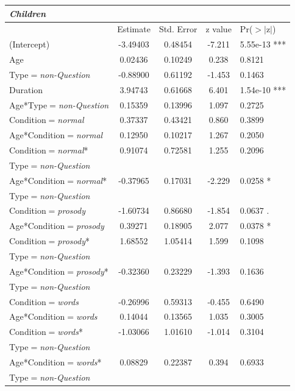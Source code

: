 \documentclass[authoryear, 12pt]{elsarticle}
\begin{document}
\begin{footnotesize}
\begin{longtable}{lcccl}
  \textbf{\textit{Children}} &&&& \\
    \hline
                       & Estimate & Std. Error & z value & Pr($>$$|$z$|$)    \\
    \hline
    (Intercept)						& -3.49403	& 0.48454		& -7.211	& 5.55e-13 ***    	\\
    Age							& 0.02436		& 0.10249		& 0.238	& 0.8121        		\\
    Type$=$\textit{non-Question}		& -0.88900	& 0.61192		& -1.453	& 0.1463        		\\
    Duration						& 3.94743		& 0.61668		& 6.401	& 1.54e-10 ***    	\\
    Age*Type$=$\textit{non-Question}	& 0.15359		& 0.13996		& 1.097	& 0.2725        		\\
	\hline
    Condition$=$\textit{normal}			& 0.37337		& 0.43421		& 0.860	& 0.3899        		\\
    Age*Condition$=$\textit{normal}		& 0.12950		& 0.10217		& 1.267	& 0.2050        		\\
    Condition$=$\textit{normal}*			& 0.91074		& 0.72581		& 1.255	& 0.2096        		\\
    \hspace*{5mm} Type$=$\textit{non-Question} &&&& \\
    Age*Condition$=$\textit{normal}*		& -0.37965	& 0.17031		& -2.229	& 0.0258 *      		\\
    \hspace*{5mm} Type$=$\textit{non-Question} &&&& \\
	\hline
    Condition$=$\textit{prosody}			& -1.60734	& 0.86680		& -1.854	& 0.0637 .      		\\
    Age*Condition$=$\textit{prosody}		& 0.39271		& 0.18905		& 2.077	& 0.0378 *      		\\
    Condition$=$\textit{prosody}*		& 1.68552		& 1.05414		& 1.599	& 0.1098        		\\
    \hspace*{5mm} Type$=$\textit{non-Question} &&&& \\
    Age*Condition$=$\textit{prosody}*	& -0.32360	& 0.23229		& -1.393	& 0.1636        		\\
    \hspace*{5mm} Type$=$\textit{non-Question} &&&& \\
	\hline
    Condition$=$\textit{words}			& -0.26996	& 0.59313		& -0.455	& 0.6490        		\\
    Age*Condition$=$\textit{words}		& 0.14044		& 0.13565		& 1.035	& 0.3005        		\\
    Condition$=$\textit{words}*			& -1.03066	& 1.01610		& -1.014	& 0.3104        		\\
    \hspace*{5mm} Type$=$\textit{non-Question} &&&& \\
    Age*Condition$=$\textit{words}*		& 0.08829		& 0.22387		& 0.394	& 0.6933        		\\
    \hspace*{5mm} Type$=$\textit{non-Question} &&&& \\


\end{longtable}
\end{footnotesize}
\end{document}
